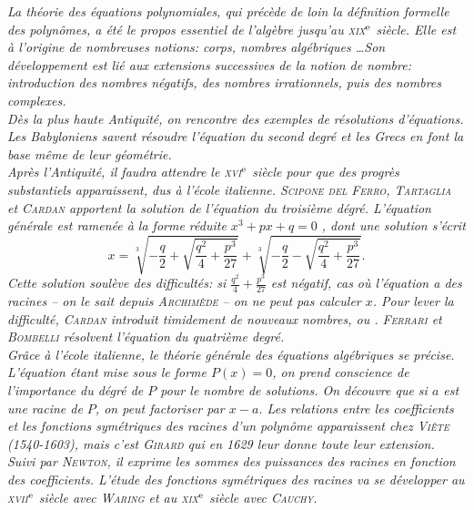 \textsl{
La théorie des équations polynomiales, qui précède de loin la définition formelle des polynômes, a été le propos essentiel de l'algèbre jusqu'au \textsc{xix}$^{\mathrm{e}}$ siècle. Elle est à l'origine de nombreuses notions: corps, nombres algébriques \dots Son développement est lié aux extensions successives de la notion de nombre: introduction des nombres négatifs, des nombres irrationnels, puis des nombres complexes. \\ 
Dès la plus haute Antiquité, on rencontre des exemples de résolutions d'équations. Les Babyloniens savent résoudre l'équation du second degré et les Grecs en font la base même de leur géométrie. \\
Après l'Antiquité, il faudra attendre le \textsc{xvi}$^{\mathrm{e}}$ siècle pour que des progrès substantiels apparaissent, dus à l'école italienne. \textsc{Scipone del Ferro}, \textsc{Tartaglia} et \textsc{Cardan} apportent la solution de l'équation du troisième dégré. L'équation générale est ramenée à la forme réduite $x^3 + px + q = 0$ \note, dont une solution s'écrit
$$x = \sqrt[3]{-\frac{q}{2} + \sqrt{\frac{q^2}{4} + \frac{p^3}{27}}} + \sqrt[3]{-\frac{q}{2} - \sqrt{\frac{q^2}{4} + \frac{p^3}{27}}}.$$
Cette solution soulève des difficultés: si $\frac{q^2}{4} + \frac{p^3}{27}$ est négatif, cas où l'équation a des racines -- on le sait depuis \textsc{Archimède} -- on ne peut pas calculer $x$. Pour lever la difficulté, \textsc{Cardan} introduit timidement de nouveaux nombres,  ou . \textsc{Ferrari} et \textsc{Bombelli} résolvent l'équation du quatrième degré. \\
Grâce à l'école italienne, le théorie générale des équations algébriques se précise. L'équation étant mise sous le forme $P(x) = 0$, on prend conscience de l'importance du dégré de $P$ pour le nombre de solutions. On découvre que si $a$ est une racine de $P$, on peut factoriser par $x-a$. Les relations entre les coefficients et les fonctions symétriques des racines d'un polynôme apparaissent chez \textsc{Viète} (1540-1603), mais c'est \textsc{Girard} qui en 1629 leur donne toute leur extension. Suivi par \textsc{Newton}, il exprime les sommes des puissances des racines en fonction des coefficients. L'étude des fonctions symétriques des racines va se développer au \textsc{xvii}$^{\mathrm{e}}$ siècle avec \textsc{Waring} et au \textsc{xix}$^{\mathrm{e}}$ siècle avec \textsc{Cauchy}. \\
}
